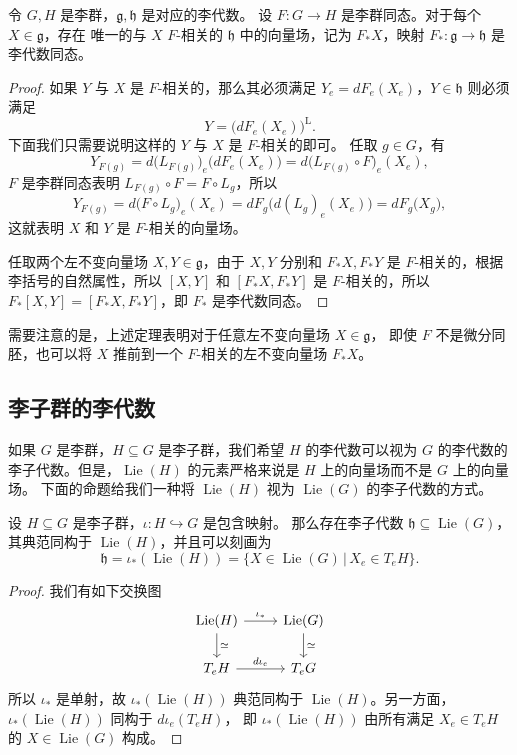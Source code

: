 \documentclass[fontset=none]{Notes}
\DeclareMathOperator\Lie{Lie}
\begin{document}
\begin{theorem}[李群同态诱导李代数同态]
  令 $G,H$ 是李群，$\mathfrak{g},\mathfrak{h}$ 是对应的李代数。
  设 $F:G\to H$ 是李群同态。对于每个 $X\in \mathfrak{g}$，存在
  唯一的与 $X$ $F$-相关的 $\mathfrak{h}$ 中的向量场，记为
  $F_*X$，映射 $F_*:\mathfrak{g}\to \mathfrak{h}$ 是李代数同态。
\end{theorem}
\begin{proof}
  如果 $Y$ 与 $X$ 是 $F$-相关的，那么其必须满足
  $Y_e=dF_e(X_e)$，$Y\in \mathfrak{h}$ 则必须满足
  \[
    Y=  \bigl(dF_e(X_e)\bigr)^{\mathrm{L}}.
  \]
  下面我们只需要说明这样的 $Y$ 与 $X$ 是 $F$-相关的即可。
  任取 $g\in G$，有
  \[
    Y_{F(g)}=d\bigl(L_{F(g)}\bigr)_{e}\bigl(dF_e(X_e)\bigr)=d\bigl(L_{F(g)}\circ F\bigr)_e
    (X_e),
  \]
  $F$ 是李群同态表明 $L_{F(g)}\circ F=F\circ L_g$，所以
  \[
    Y_{F(g)}=d\bigl(F\circ L_g\bigr)_e(X_e)=dF_g\bigl(d(L_g)_e(X_e )\bigr)
    =dF_g\bigl(X_g\bigr),
  \]
  这就表明 $X$ 和 $Y$ 是 $F$-相关的向量场。

  任取两个左不变向量场 $X,Y\in \mathfrak{g}$，由于 $X,Y$ 分别和 $F_*X,F_*Y$ 
  是 $F$-相关的，根据李括号的自然属性，所以 $[X,Y]$ 和 $[F_*X,F_*Y]$
  是 $F$-相关的，所以 $F_*[X,Y]=[F_*X,F_*Y]$，即 $F_*$ 是李代数同态。
\end{proof}

需要注意的是，上述定理表明对于任意左不变向量场 $X\in \mathfrak{g}$，
即使 $F$ 不是微分同胚，也可以将 $X$ 推前到一个 $F$-相关的左不变向量场
$F_*X$。

\subsection{李子群的李代数}

如果 $G$ 是李群，$H\subseteq G$ 是李子群，我们希望 $H$
的李代数可以视为 $G$ 的李代数的李子代数。但是，$\Lie(H)$
的元素严格来说是 $H$ 上的向量场而不是 $G$ 上的向量场。
下面的命题给我们一种将 $\Lie(H)$ 视为 $\Lie(G)$ 的李子代数的方式。

\begin{theorem}[李子群的李代数]
  设 $H\subseteq G$ 是李子群，$\iota:H\hookrightarrow G$ 是包含映射。
  那么存在李子代数 $\mathfrak{h}\subseteq\Lie(G)$，其典范同构于
  $\Lie(H)$，并且可以刻画为
  \[
    \mathfrak{h}=\iota_*(\Lie(H))=\{X\in \Lie(G)\,|\, X_e\in T_eH\}.  
  \]
\end{theorem}
\begin{proof}
  我们有如下交换图
  \[
    \begin{tikzcd}
      \Lie(H)\arrow[r,"\iota_*"]\arrow[d,"\simeq"] & \Lie(G)\arrow[d,"\simeq"]\\
      T_eH\arrow[r,"d\iota_e"] & T_eG
    \end{tikzcd}  
  \]
  所以 $\iota_*$ 是单射，故 $\iota_*(\Lie(H))$ 典范同构于
  $\Lie(H)$。另一方面，$\iota_*(\Lie(H))$ 同构于 $d\iota_e(T_eH)$，
  即 $\iota_*(\Lie(H))$ 由所有满足 $X_e\in T_eH$ 的 $X\in\Lie(G)$ 构成。
\end{proof}
\end{document}
